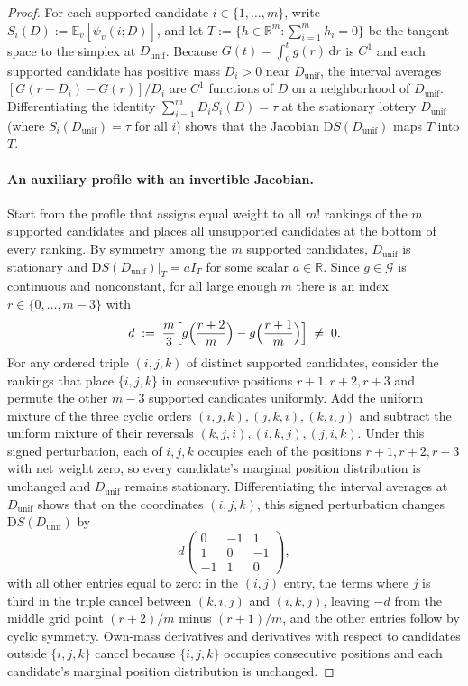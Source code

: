 \documentclass[11pt]{article}
\numberwithin{equation}{section}
\theoremstyle{plain}
\theoremstyle{definition}
\newcommand{\E}{\mathbb{E}}
\newcommand{\R}{\mathbb{R}}
\newcommand{\1}{\mathbf{1}}
\newcommand{\calG}{\mathcal{G}}
\begin{document}
\begin{proof}
For each supported candidate $i \in \{1, \dots, m\}$, write $S_i(D) := \E_v[\psi_v(i; D)]$, and let $T := \{h \in \R^m : \sum_{i=1}^m h_i = 0\}$ be the tangent space to the simplex at $D_{\mathrm{unif}}$. Because $G(t) = \int_0^t g(r)\,\mathrm{d}r$ is $C^1$ and each supported candidate has positive mass $D_i > 0$ near $D_{\mathrm{unif}}$, the interval averages $[G(r + D_i) - G(r)]/D_i$ are $C^1$ functions of $D$ on a neighborhood of $D_{\mathrm{unif}}$. Differentiating the identity $\sum_{i=1}^m D_i S_i(D) = \tau$ at the stationary lottery $D_{\mathrm{unif}}$ (where $S_i(D_{\mathrm{unif}}) = \tau$ for all $i$) shows that the Jacobian $\mathrm{D}S(D_{\mathrm{unif}})$ maps $T$ into $T$.

\paragraph{An auxiliary profile with an invertible Jacobian.}
Start from the profile that assigns equal weight to all $m!$ rankings of the $m$ supported candidates and places all unsupported candidates at the bottom of every ranking. By symmetry among the $m$ supported candidates, $D_{\mathrm{unif}}$ is stationary and $\mathrm{D}S(D_{\mathrm{unif}})\big|_T = a I_T$ for some scalar $a \in \R$. Since $g \in \calG$ is continuous and nonconstant, for all large enough $m$ there is an index $r \in \{0, \dots, m - 3\}$ with
\[
  d \;:=\; \frac{m}{3}\Bigl[g\Bigl(\frac{r + 2}{m}\Bigr) - g\Bigl(\frac{r + 1}{m}\Bigr)\Bigr] \;\ne\; 0.
\]
For any ordered triple $(i, j, k)$ of distinct supported candidates, consider the rankings that place $\{i, j, k\}$ in consecutive positions $r + 1, r + 2, r + 3$ and permute the other $m - 3$ supported candidates uniformly. Add the uniform mixture of the three cyclic orders $(i, j, k), (j, k, i), (k, i, j)$ and subtract the uniform mixture of their reversals $(k, j, i), (i, k, j), (j, i, k)$. Under this signed perturbation, each of $i, j, k$ occupies each of the positions $r + 1, r + 2, r + 3$ with net weight zero, so every candidate's marginal position distribution is unchanged and $D_{\mathrm{unif}}$ remains stationary. Differentiating the interval averages at $D_{\mathrm{unif}}$ shows that on the coordinates $(i, j, k)$, this signed perturbation changes $\mathrm{D}S(D_{\mathrm{unif}})$ by
\[
  d\begin{pmatrix}
    0 & -1 & 1 \\
    1 & 0 & -1 \\
    -1 & 1 & 0
  \end{pmatrix},
\]
with all other entries equal to zero: in the $(i, j)$ entry, the terms where $j$ is third in the triple cancel between $(k, i, j)$ and $(i, k, j)$, leaving $-d$ from the middle grid point $(r + 2)/m$ minus $(r + 1)/m$, and the other entries follow by cyclic symmetry. Own-mass derivatives and derivatives with respect to candidates outside $\{i, j, k\}$ cancel because $\{i, j, k\}$ occupies consecutive positions and each candidate's marginal position distribution is unchanged.


\end{proof}
\end{document}
